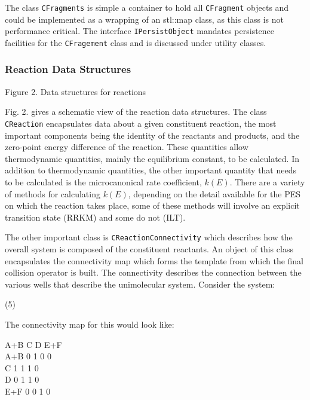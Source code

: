 The class \verb|CFragments| is simple a container to hold all \verb|CFragment| objects and could be implemented as a wrapping of an stl::map class, as this class is not performance critical. The interface \verb|IPersistObject| mandates persistence facilities for the \verb|CFragement| class and is discussed under utility classes.

\subsubsection{Reaction Data Structures
}\label{sec:ReactionDataStructures
}

 

Figure 2. Data structures for reactions

Fig. 2. gives a schematic view of the reaction data structures. The class \verb|CReaction| encapsulates data about a given constituent reaction, the most important components being the identity of the reactants and products, and the zero-point energy difference of the reaction. These quantities allow thermodynamic quantities, mainly the equilibrium constant, to be calculated. In addition to thermodynamic quantities, the other important quantity that needs to be calculated is the microcanonical rate coefficient, $k(E)$. There are a variety of methods for calculating $k(E)$, depending on the detail available for the PES on which the reaction takes place, some of these methods will involve an explicit transition state (RRKM) and some do not (ILT).

The other important class is \verb|CReactionConnectivity| which describes how the overall system is composed of the constituent reactants. An object of this class encapsulates the connectivity map which forms the template from which the final collision operator is built. The connectivity describes the connection between the various wells that describe the unimolecular system. Consider the system:

  (5)

The connectivity map for this would look like:

  A+B C D E+F\\
A+B 0 1 0 0\\
C 1 1 1 0\\
D 0 1 1 0\\
E+F 0 0 1 0\\

